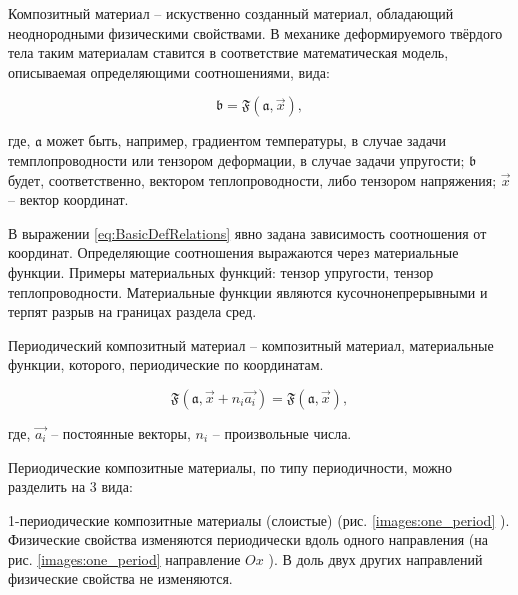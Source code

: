 Композитный материал -- искуственно созданный материал, обладающий неоднородными физическими свойствами.
В механике деформируемого твёрдого тела таким материалам ставится в соответствие математическая модель, описываемая определяющими соотношениями, вида:

\cite{Bahvalov,Omsk}

\begin{equation}
    \label{eq:BasicDefRelations}
    \mathfrak{b} = \mathfrak{F}(\mathfrak{a}, \vec{x}),
\end{equation}

где, 
$\mathfrak{a}$ 
может быть, например, градиентом температуры, в случае задачи темплопроводности или тензором деформации, в случае задачи упругости; 
$\mathfrak{b}$ 
будет, соответственно, вектором теплопроводности, либо тензором напряжения; 
$\vec{x}$ 
-- вектор координат.

В выражении 
\ref{eq:BasicDefRelations} 
явно задана зависимость соотношения от координат. 
Определяющие соотношения выражаются через материальные функции.
Примеры материальных функций: тензор упругости, тензор теплопроводности.
Материальные функции являются кусочнонепрерывными и терпят разрыв на границах раздела сред.


Периодический композитный материал -- композитный материал, материальные функции, которого, периодические по координатам.

\begin{equation}
    \label{eq:BasicPeriodicFuction}
    \mathfrak{F}(\mathfrak{a}, \vec{x} + n_i\vec{a_i}) = \mathfrak{F}(\mathfrak{a}, \vec{x}),
\end{equation}

где, 
$\vec{a_i}$ 
-- постоянные векторы, 
$n_i$ 
-- произвольные числа.

Периодические композитные материалы, по типу периодичности, можно разделить на 3 вида:

1-периодические композитные материалы (слоистые) (рис. 
\ref{images:one_period}
).
Физические свойства изменяются периодически вдоль одного направления (на рис. 
\ref{images:one_period}
направление 
$Ox$
). В доль двух других направлений физические свойства не изменяются.

